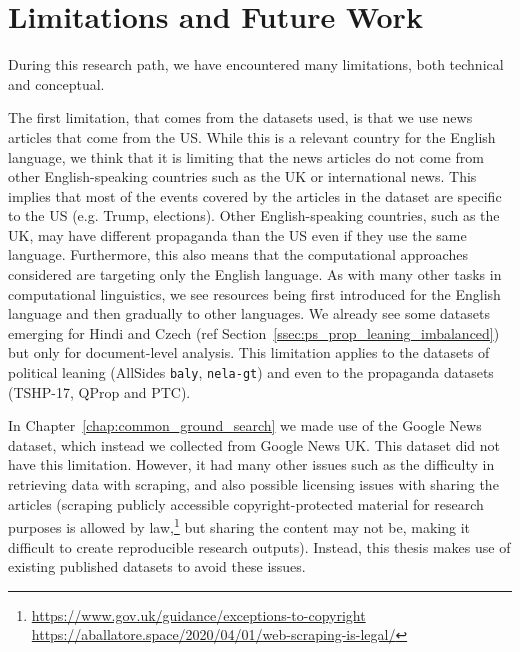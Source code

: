 \section{\statusgreen Limitations and Future Work}
\label{sec:discussion_limitations}

During this research path, we have encountered many limitations, both technical and conceptual.


The first limitation, that comes from the datasets used, is that we use news articles that come from the US. While this is a relevant country for the English language, we think that it is limiting that the news articles do not come from other English-speaking countries %
such as the UK or international news.
This implies that most of the events covered by the articles in the dataset are specific to the US (e.g. Trump, elections).
Other English-speaking countries, such as the UK, may have different propaganda than the US even if they use the same language.
Furthermore, this also means that the computational approaches considered are targeting only the English language. %
As with many other tasks in computational linguistics, we see resources being first introduced for the English language and then gradually to other languages.
We already see some datasets emerging for Hindi and Czech (ref Section~\ref{ssec:ps_prop_leaning_imbalanced}) but only for document-level analysis.
This limitation applies to the datasets of political leaning (AllSides \texttt{baly}, \texttt{nela-gt}) and even to the propaganda datasets (TSHP-17, QProp and PTC).

In Chapter~\ref{chap:common_ground_search} we made use of the Google News dataset, which instead we collected from Google News UK. This dataset did not have this limitation.
However, it had many other issues such as the difficulty in retrieving data with scraping, and also possible licensing issues with sharing the articles (scraping publicly accessible copyright-protected material for research purposes is allowed by law,\footnote{\url{https://www.gov.uk/guidance/exceptions-to-copyright} \\ \url{https://aballatore.space/2020/04/01/web-scraping-is-legal/}} but sharing the content may not be, making it difficult to create reproducible research outputs).
Instead, this thesis makes use of existing published datasets to avoid these issues.

